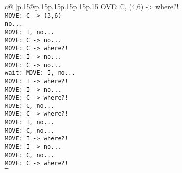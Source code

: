 \documentclass{article}
\begin{document}
{\begin{supertabular}{c@{$\;$}|p{.15\linewidth}@{}p{.15\linewidth}p{.15\linewidth}p{.15\linewidth}p{.15\linewidth}p{.15\linewidth}}
{{{OVE: C, (4,6) -> where?!\\ \tt  MOVE: C -> (3,6) \\ \tt  no...\\ \tt  MOVE: I, no...\\ \tt  MOVE: C -> no...\\ \tt  MOVE: C -> where?!\\ \tt  MOVE: I -> no...\\ \tt  MOVE: C -> no...\\ \tt  wait: MOVE: I, no...\\ \tt  MOVE: I -> where?!\\ \tt  MOVE: I -> no...\\ \tt  MOVE: C -> where?!\\ \tt  MOVE: C, no...\\ \tt  MOVE: C -> where?!\\ \tt  MOVE: I, no...\\ \tt  MOVE: C, no...\\ \tt  MOVE: I -> where?!\\ \tt  MOVE: I -> no...\\ \tt  MOVE: C, no...\\ \tt  MOVE: C -> where?!\\ \t}}}
\end{supertabular}}
\end{document}
